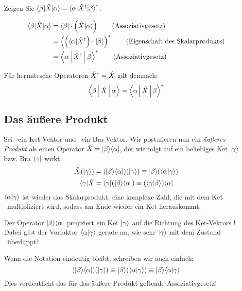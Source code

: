 \begin{aufg}
 Zeigen Sie $\brab\opx\keta = \cc{\braa\opxh\ketb}$.
\end{aufg}
\begin{loes}
 \begin{align}
  \brab\opx\keta &= \brab \cdot \left(\opx\keta\right) \tag{Assoziativgesetz} \\
  &= \cc{\left(\left(\braa\opxh\right) \cdot \ketb \right)} \tag{Eigenschaft des Skalarprodukts} \\
  &= \cc{\Braket{\alpha | \opxh | \beta}} \tag{Assoziativgesetz}
 \end{align}
 \qedsymbol
\end{loes}

\begin{notiz}
 F\"ur hermitesche Operatoren ${\hat{X}}^{\dag} = \hat{X}$ gilt demnach:
 \begin{equation}
  \Braket{\beta | \hat{X} | \alpha} = \Braket{\alpha | \hat{X} | \beta}^*
 \end{equation}

\end{notiz}


\subsection{Das \"au\ss{}ere Produkt}
\begin{post}
 Sei \ketb\ ein Ket-Vektor und \braa\ ein Bra-Vektor. Wir postulieren nun ein \emph{\"au\ss{}eres Produkt} als einen Operator $\opx = \ketb\braa$, der wie folgt auf ein beliebiges Ket $\ket{\gamma}$ bzw. Bra $\bra{\gamma}$ wirkt:
 \begin{align}
  \opx (\ket{\gamma}) &= (\ketb\braa)(\ket{\gamma}) \equiv \ketb (\braket{\alpha|\gamma}) \\
  \bra{\gamma} \opx &= \bra{\gamma} (\ketb\braa) \equiv (\braket{\gamma | \beta}) \braa
 \end{align}
 $\braket{\alpha|\gamma}$ ist wieder das Skalarprodukt, eine komplexe Zahl, die mit dem Ket \ketb\ multipliziert wird, sodass am Ende wieder ein Ket herauskommt.
\end{post}
\begin{notiz}
 Der Operator $\ketb\braa$ projiziert ein Ket $\ket{\gamma}$ auf die Richtung des Ket-Vektors \ketb! Dabei gibt der Vorfaktor $\braket{\alpha|\gamma}$ gerade an, wie sehr $\ket{\gamma}$ mit dem Zustand \keta\ \"uberlappt!
\end{notiz}
\begin{konv}
 Wenn die Notation eindeutig bleibt, schreiben wir auch einfach:
 \begin{equation}
  (\ketb\braa)(\ket{\gamma}) \equiv \ketb (\braket{\alpha|\gamma}) \equiv \ketb\braket{\alpha|\gamma}
 \end{equation}
 Dies verdeutlicht das f\"ur das \"au\ss{}ere Produkt geltende Assoziativgesetz!
\end{konv}

